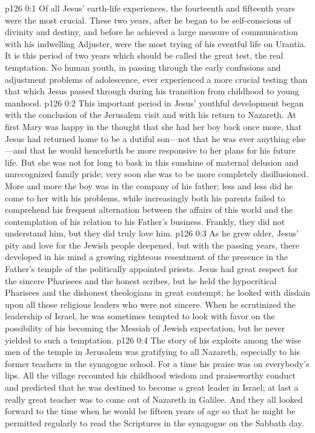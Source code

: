 \author{Midwayer Commission}
\vs p126 0:1 Of all Jesus’ earth\hyp{}life experiences, the fourteenth and fifteenth years were the most crucial. These two years, after he began to be self\hyp{}conscious of divinity and destiny, and before he achieved a large measure of communication with his indwelling Adjuster, were the most trying of his eventful life on Urantia. It is this period of two years which should be called the great test, the real temptation. No human youth, in passing through the early confusions and adjustment problems of adolescence, ever experienced a more crucial testing than that which Jesus passed through during his transition from childhood to young manhood.
\vs p126 0:2 This important period in Jesus’ youthful development began with the conclusion of the Jerusalem visit and with his return to Nazareth. At first Mary was happy in the thought that she had her boy back once more, that Jesus had returned home to be a dutiful son---not that he was ever anything else---and that he would henceforth be more responsive to her plans for his future life. But she was not for long to bask in this sunshine of maternal delusion and unrecognized family pride; very soon she was to be more completely disillusioned. More and more the boy was in the company of his father; less and less did he come to her with his problems, while increasingly both his parents failed to comprehend his frequent alternation between the affairs of this world and the contemplation of his relation to his Father’s business. Frankly, they did not understand him, but they did truly love him.
\pc \vs p126 0:3 As he grew older, Jesus’ pity and love for the Jewish people deepened, but with the passing years, there developed in his mind a growing righteous resentment of the presence in the Father’s temple of the politically appointed priests. Jesus had great respect for the sincere Pharisees and the honest scribes, but he held the hypocritical Pharisees and the dishonest theologians in great contempt; he looked with disdain upon all those religious leaders who were not sincere. When he scrutinized the leadership of Israel, he was sometimes tempted to look with favor on the possibility of his becoming the Messiah of Jewish expectation, but he never yielded to such a temptation.
\pc \vs p126 0:4 The story of his exploits among the wise men of the temple in Jerusalem was gratifying to all Nazareth, especially to his former teachers in the synagogue school. For a time his praise was on everybody’s lips. All the village recounted his childhood wisdom and praiseworthy conduct and predicted that he was destined to become a great leader in Israel; at last a really great teacher was to come out of Nazareth in Galilee. And they all looked forward to the time when he would be fifteen years of age so that he might be permitted regularly to read the Scriptures in the synagogue on the Sabbath day.
